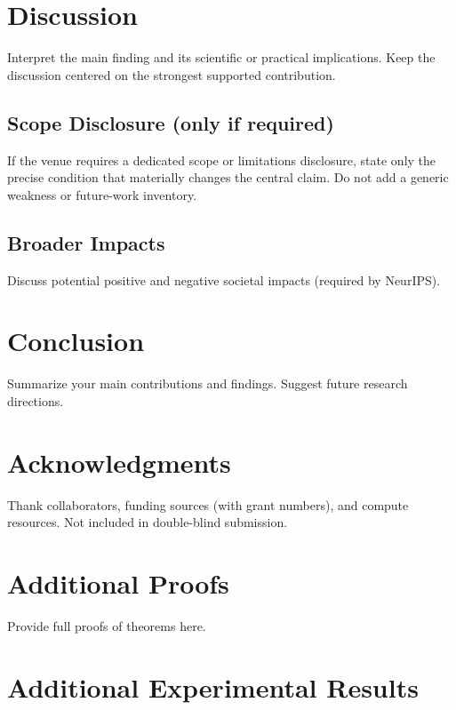 \documentclass{article}
\begin{document}
\section{Discussion}
\label{sec:discussion}

Interpret the main finding and its scientific or practical implications. Keep the discussion centered on the strongest supported contribution.

\subsection{Scope Disclosure (only if required)}
If the venue requires a dedicated scope or limitations disclosure, state only the precise condition that materially changes the central claim. Do not add a generic weakness or future-work inventory.

\subsection{Broader Impacts}
Discuss potential positive and negative societal impacts (required by NeurIPS).

\section{Conclusion}
\label{sec:conclusion}

Summarize your main contributions and findings. Suggest future research directions.

\section*{Acknowledgments}
Thank collaborators, funding sources (with grant numbers), and compute resources. Not included in double-blind submission.


\appendix

\section{Additional Proofs}
\label{app:proofs}

Provide full proofs of theorems here.

\section{Additional Experimental Results}
\label{app:experiments}
\end{document}
